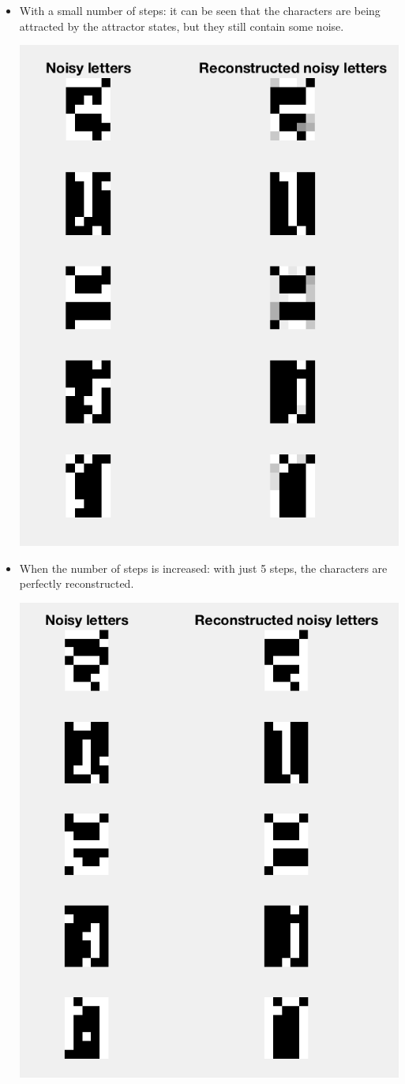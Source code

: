 \documentclass[10pt]{article}
\begin{document}
\begin{multicols}{2}
  \begin{itemize}
  \item With a small number of steps: it can be seen that the
    characters are being attracted by the attractor states, but they still
    contain some noise.
    \begin{center}
      \includegraphics[height=\linewidth]{img/recons1}
    \end{center}
  \item When the number of steps is increased: with just 5 steps, the
    characters are perfectly reconstructed.
    \begin{center}
      \includegraphics[height=\linewidth]{img/recons2}
    \end{center}
  \end{itemize}


\end{multicols}
\end{document}
